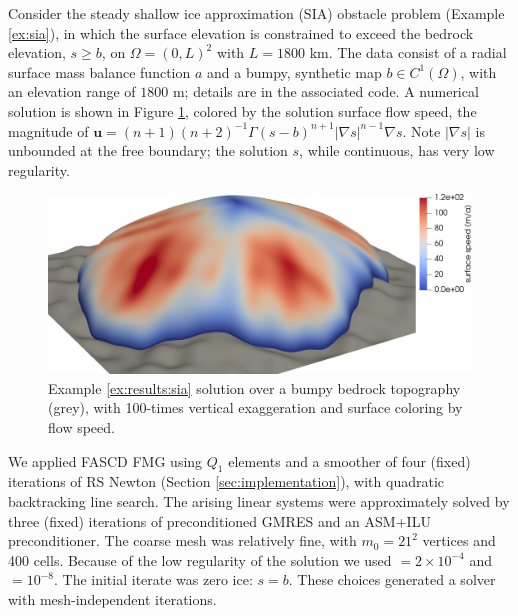 \documentclass[review,hidelinks,onefignum,onetabnum,final]{siamart220329}  %
\newcommand{\grad}{\nabla}
\begin{document}
\begin{example}   \label{ex:results:sia}
Consider the steady shallow ice approximation (SIA) obstacle problem (Example \ref{ex:sia}), in which the surface elevation is constrained to exceed the bedrock elevation, $s\ge b$, on $\Omega=(0,L)^2$ with $L=1800$ km.  The data consist of a radial surface mass balance function $a$ \cite[equation (5.122)]{GreveBlatter2009} and a bumpy, synthetic map $b\in C^1(\Omega)$, with an elevation range of $1800$ m; details are in the associated code.  A numerical solution is shown in Figure \ref{fig:results:siascene}, colored by the solution surface flow speed, the magnitude of $\mathbf{u} = (n+1)(n+2)^{-1} \Gamma (s-b)^{n+1} |\grad s|^{n-1} \grad s$.  Note $|\grad s|$ is unbounded at the free boundary; the solution $s$, while continuous, has very low regularity.

\begin{figure}[ht]
\centering
\includegraphics[width=1.0\textwidth]{sialev8scene.png}
\caption{Example \ref{ex:results:sia} solution over a bumpy bedrock topography (grey), with 100-times vertical exaggeration and surface coloring by flow speed.}
\label{fig:results:siascene}
\end{figure}

We applied FASCD FMG using $Q_1$ elements and a smoother of four (fixed) iterations of RS Newton (Section \ref{sec:implementation}), with quadratic backtracking line search.  The arising linear systems were approximately solved by three (fixed) iterations of preconditioned GMRES and an ASM+ILU preconditioner.  The coarse mesh was relatively fine, with $m_0=21^2$ vertices and 400 cells.  Because of the low regularity of the solution we used  $= 2 \times 10^{-4}$ and  $= 10^{-8}$.  The initial iterate was zero ice: $s=b$.  These choices generated a solver with mesh-independent iterations.


\end{example}
\end{document}
